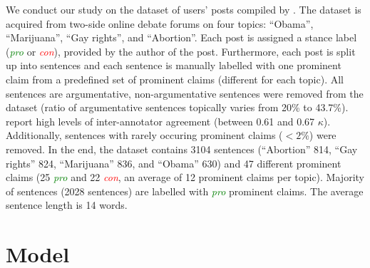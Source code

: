 We conduct our study on the dataset of users' posts compiled by \citet{hasan2014you}. 
The dataset is acquired from two-side online debate forums on four topics: 
``Obama'', ``Marijuana'', ``Gay rights'', and ``Abortion''.
Each post is assigned a stance label (\textit{\textcolor{green}{pro}} or 
\textit{\textcolor{red}{con}}), provided
by the author of the post. 
Furthermore, each post is split up into sentences and each sentence is manually labelled
with one prominent claim from a predefined set of prominent claims 
(different for each topic). 
All sentences are argumentative, non-argumentative sentences were removed from the 
dataset (ratio of argumentative sentences topically varies from  20\% to 43.7\%). 
\citet{hasan2014you} report high levels of inter-annotator agreement (between
0.61 and 0.67 $\kappa$). 
Additionally, sentences with rarely occuring prominent claims ($<2\%$) were removed. 
In the end, the dataset contains 3104 sentences (``Abortion'' 814, ``Gay rights'' 824, 
``Marijuana'' 836, and ``Obama'' 630) and 47 different prominent claims
(25 \textit{\textcolor{green}{pro}} and 22 \textit{\textcolor{red}{con}}, an
average of 12 prominent claims per topic).  Majority of sentences (2028
sentences) are labelled with \textit{\textcolor{green}{pro}} prominent claims.
The average sentence length is 14 words. 

\section{Model}
\label{sec:argclu_model}

